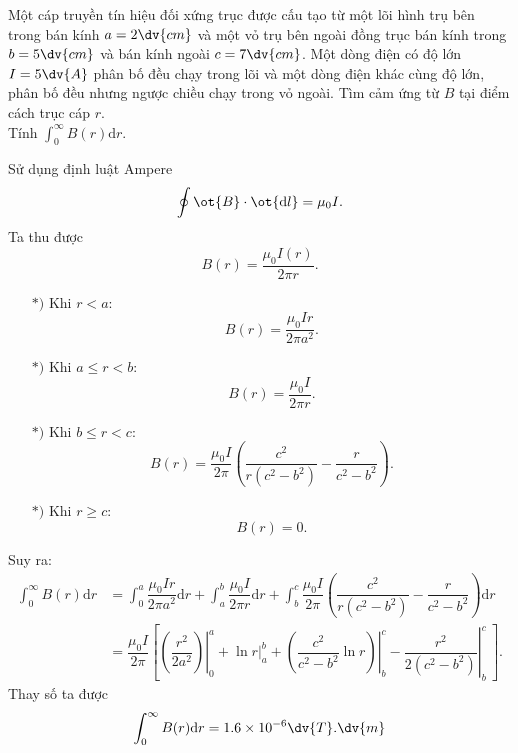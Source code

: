 \begin{vd}
    Một cáp truyền tín hiệu đối xứng trục được cấu tạo từ một lõi hình trụ bên trong bán kính $a=2\dv{cm}$ và một vỏ trụ bên ngoài đồng trục bán kính trong $b=5\dv{cm}$ và bán kính ngoài $c=7\dv{cm}$. Một dòng điện có độ lớn $I=5\dv{A}$ phân bố đều chạy trong lõi và một dòng điện khác cùng độ lớn, phân bố đều nhưng ngược chiều chạy trong vỏ ngoài. Tìm cảm ứng từ $B$ tại điểm cách trục cáp $r$.\\ 
    Tính $\displaystyle\int^\infty_0B(r)\mathrm{d}r$. 
\end{vd}
\begin{loigiai}
    Sử dụng định luật Ampere
    $$ \oint \ot{B} \cdot \ot{\mathrm{d}l}= \mu_0I.$$
    Ta thu được 
    $$ B(r)=\dfrac{\mu_0I(r)}{2\pi r}.$$
    \begin{itemize}
        \item[$*)$] Khi $r<a:$ $$ B(r)=\dfrac{\mu_0Ir}{2\pi a^2}. $$
        \item[$*)$] Khi $a\leq r<b:$  $$B(r)=\dfrac{\mu_0I}{2\pi r}.$$
        \item[$*)$] Khi $b\leq r<c:$  $$B(r)=\dfrac{\mu_0I}{2\pi}\left(\dfrac{c^2}{r(c^2-b^2)}-\dfrac{r}{c^2-b^2}\right).$$
        \item[$*)$] Khi $r\geq c:$ $$B(r)=0.$$
    \end{itemize}
    Suy ra: 
    \begin{equation*}
        \begin{aligned}
            \int_0^\infty B(r)\mathrm{d}r &= \int_0^a\dfrac{\mu_0Ir}{2\pi a^2}\mathrm{d}r + \int_a^b\dfrac{\mu_0I}{2\pi r}\mathrm{d}r + \int_b^c\dfrac{\mu_0I}{2\pi}\left(\dfrac{c^2}{r(c^2-b^2)} - \dfrac{r}{c^2-b^2}\right)\mathrm{d}r\\
            &= \dfrac{\mu_0I}{2\pi}\left[\left.\left(\dfrac{r^2}{2a^2}\right) \right|_0^a + \left. \ln{r}\right|_a^b + \left.\left(\dfrac{c^2}{c^2-b^2}\ln{r}\right)\right|_b^c - \left.\dfrac{r^2}{2(c^2-b^2)}\right|_b^c \ \right].
        \end{aligned}
    \end{equation*}
    Thay số ta được
    $$\int_0^\infty B(r)\mathrm{d}r = 1.6\times10^{-6}\dv{T}.\dv{m}$$
    \end{loigiai}


